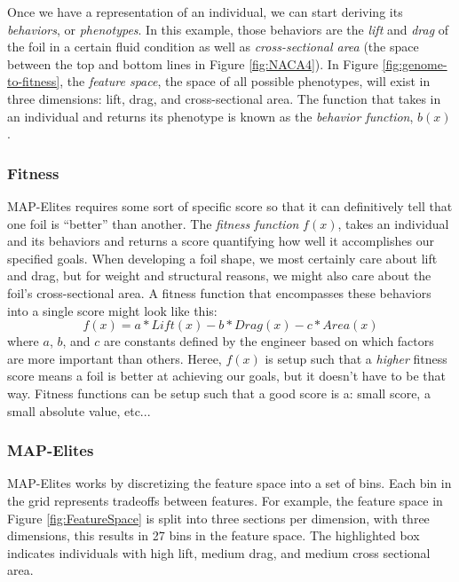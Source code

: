 \documentclass{sig-alternate}
\begin{document}
Once we have a representation of an individual, we can start deriving its \textit{behaviors}, or \textit{phenotypes}.
In this example, those behaviors are the \emph{lift} and \emph{drag} of the foil in a certain fluid condition as well as \emph{cross-sectional area} (the space between the top and bottom lines in Figure \ref{fig:NACA4}).
In Figure \ref{fig:genome-to-fitness}, the \textit{feature space}, the space of all possible phenotypes, will exist in three dimensions: lift, drag, and cross-sectional area.
The function that takes in an individual and returns its phenotype is known as the \textit{behavior function}, $b(x)$.

\subsubsection{Fitness}
\label{sec:fitness}

MAP-Elites requires some sort of specific score so that it can definitively tell that one foil is ``better'' than another.
The \textit{fitness function} $f(x)$, takes an individual and its behaviors and returns a score quantifying how well it accomplishes our specified goals.
When developing a foil shape, we most certainly care about lift and drag, but for weight and structural reasons, we might also care about the foil's cross-sectional area.
A fitness function that encompasses these behaviors into a single score might look like this:
$$f(x) = a*\textit{Lift}(x) - b *\textit{Drag}(x) - c*\textit{Area}(x)$$
where $a$, $b$, and $c$ are constants defined by the engineer based on which factors are more important than others.
Heree, $f(x)$ is setup such that a \textit{higher} fitness score means a foil is better at achieving our goals, but it doesn't have to be that way.
Fitness functions can be setup such that a good score is a: small score, a small absolute value, etc...

\subsubsection{MAP-Elites}

MAP-Elites works by discretizing the feature space into a set of bins.
Each bin in the grid represents tradeoffs between features.
For example, the feature space in Figure \ref{fig:FeatureSpace} is split into three sections per dimension, with three dimensions, this results in 27 bins in the feature space.
The highlighted box indicates individuals with high lift, medium drag, and medium cross sectional area.
\end{document}
